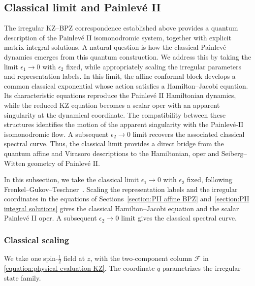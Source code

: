 \documentclass[a4paper,11pt]{article}
\newcommand{\cF}{\mathcal{F}}
\numberwithin{equation}{section}
\begin{document}
\subsection{Classical limit and Painlev\'e II}
\label{section:PII classical WZW limit}

The irregular KZ–BPZ correspondence established above provides a quantum description of the Painlev\'e II isomonodromic system, together with explicit matrix-integral solutions. A natural question is how the classical Painlev\'e dynamics emerges from this quantum construction. We address this by taking the limit $\epsilon_1\to0$ with $\epsilon_2$ fixed, while appropriately scaling the irregular parameters and representation labels. In this limit, the affine conformal block develops a common classical exponential whose action satisfies a Hamilton–Jacobi equation. Its characteristic equations reproduce the Painlev\'e II Hamiltonian dynamics, while the reduced KZ equation becomes a scalar oper with an apparent singularity at the dynamical coordinate. The compatibility between these structures identifies the motion of the apparent singularity with the Painlevé-II isomonodromic flow. A subsequent $\epsilon_2\to0$ limit recovers the associated classical spectral curve. Thus, the classical limit provides a direct bridge from the quantum affine and Virasoro descriptions to the Hamiltonian, oper and Seiberg–Witten geometry of Painlev\'e II.

In this subsection, we take the classical limit $\epsilon_{1}\to0$ with
$\epsilon_{2}$ fixed, following
Frenkel--Gukov--Teschner~\cite[Appendix~D, especially
(D.4)--(D.7) and (D.12)--(D.13)]{FrenkelGukovTeschner2015}.
Scaling the representation labels and the irregular coordinates in
the equations of Sections~\ref{section:PII affine BPZ} and~\ref{section:PII integral solutions} gives the classical Hamilton--Jacobi
equation and the scalar Painlev\'e II oper.  A subsequent
$\epsilon_{2}\to0$ limit gives
the classical spectral curve.

\subsubsection{Classical scaling}

We take one spin-$\frac{1}{2}$ field at $z$, with the two-component column
$\cF$ in \eqref{equation:physical evaluation KZ}.  The coordinate
$q$ parametrizes the irregular-state family.
\end{document}
